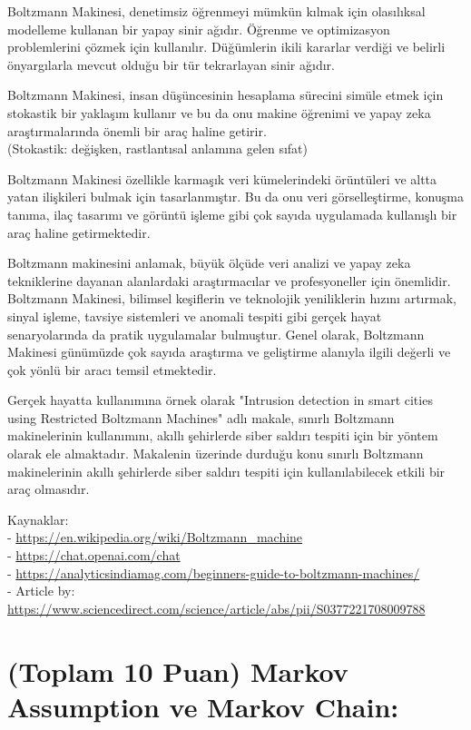 \documentclass[11pt]{article}
\begin{document}
Boltzmann Makinesi, denetimsiz öğrenmeyi mümkün kılmak için olasılıksal modelleme kullanan bir yapay sinir ağıdır. Öğrenme ve optimizasyon problemlerini çözmek için kullanılır. Düğümlerin ikili kararlar verdiği ve belirli önyargılarla mevcut olduğu bir tür tekrarlayan sinir ağıdır.

Boltzmann Makinesi, insan düşüncesinin hesaplama sürecini simüle etmek için stokastik bir yaklaşım kullanır ve bu da onu makine öğrenimi ve yapay zeka araştırmalarında önemli bir araç haline getirir.
\\(Stokastik: değişken, rastlantısal anlamına gelen sıfat)

Boltzmann Makinesi özellikle karmaşık veri kümelerindeki örüntüleri ve altta yatan ilişkileri bulmak için tasarlanmıştır. Bu da onu veri görselleştirme, konuşma tanıma, ilaç tasarımı ve görüntü işleme gibi çok sayıda uygulamada kullanışlı bir araç haline getirmektedir. 

Boltzmann makinesini anlamak, büyük ölçüde veri analizi ve yapay zeka tekniklerine dayanan alanlardaki araştırmacılar ve profesyoneller için önemlidir. Boltzmann Makinesi, bilimsel keşiflerin ve teknolojik yeniliklerin hızını artırmak, sinyal işleme, tavsiye sistemleri ve anomali tespiti gibi gerçek hayat senaryolarında da pratik uygulamalar bulmuştur. 
Genel olarak, Boltzmann Makinesi günümüzde çok sayıda araştırma ve geliştirme alanıyla ilgili değerli ve çok yönlü bir aracı temsil etmektedir. 

Gerçek hayatta kullanımına örnek olarak "Intrusion detection in smart cities using Restricted Boltzmann Machines" adlı makale, sınırlı Boltzmann makinelerinin kullanımını, akıllı şehirlerde siber saldırı tespiti için bir yöntem olarak ele almaktadır. Makalenin üzerinde durduğu konu sınırlı Boltzmann makinelerinin akıllı şehirlerde siber saldırı tespiti için kullanılabilecek etkili bir araç olmasıdır.

Kaynaklar:
\\ - \url{https://en.wikipedia.org/wiki/Boltzmann_machine}
\\ - \url{https://chat.openai.com/chat}
\\ - \url{https://analyticsindiamag.com/beginners-guide-to-boltzmann-machines/}
\\ - Article by: \url{https://www.sciencedirect.com/science/article/abs/pii/S0377221708009788}


\section{(Toplam 10 Puan) Markov Assumption ve Markov Chain:}
\end{document}
